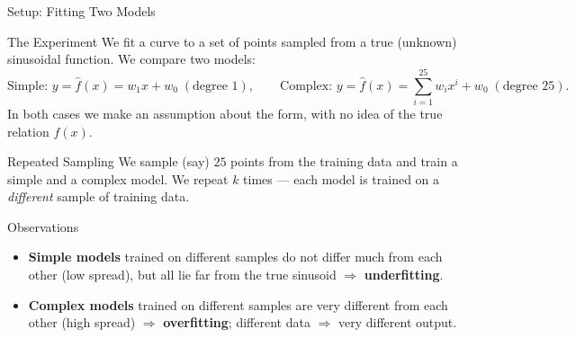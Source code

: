 \documentclass{beamer}
\begin{document}
\begin{frame}[shrink=10]{Setup: Fitting Two Models}
  \begin{block}{The Experiment}
    We fit a curve to a set of points sampled from a true (unknown)
    sinusoidal function. We compare two models:
    \[
      \text{Simple: } y = \hat f(x) = w_1 x + w_0 \;(\text{degree }1),
      \qquad
      \text{Complex: } y = \hat f(x) = \sum_{i=1}^{25} w_i x^i + w_0 \;(\text{degree }25).
    \]
    In both cases we make an assumption about the form, with no idea of the
    true relation $f(x)$.
  \end{block}

  \begin{block}{Repeated Sampling}
    We sample (say) $25$ points from the training data and train a simple
    and a complex model. We repeat $k$ times --- each model is trained on a
    \emph{different} sample of training data.
  \end{block}

  \begin{exampleblock}{Observations}
    \begin{itemize}\setlength\itemsep{3pt}
      \item \textbf{Simple models} trained on different samples do not
            differ much from each other (low spread), but all lie far from
            the true sinusoid $\Rightarrow$ \textbf{underfitting}.
      \item \textbf{Complex models} trained on different samples are very
            different from each other (high spread) $\Rightarrow$
            \textbf{overfitting}; different data $\Rightarrow$ very
            different output.
    \end{itemize}
  \end{exampleblock}
\end{frame}
\end{document}
